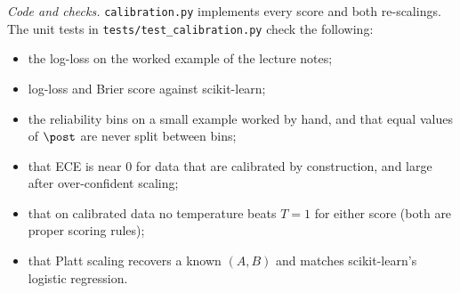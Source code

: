 \begin{sloppypar}
\emph{Code and checks.} \texttt{calibration.py} implements every score and both re-scalings.
The unit tests in \texttt{tests/test\_calibration.py} check the following:
\end{sloppypar}
\begin{itemize}[itemsep=1pt,topsep=2pt]
  \item the log-loss on the worked example of the lecture notes;
  \item log-loss and Brier score against scikit-learn;
  \item the reliability bins on a small example worked by hand, and that equal values of $\post$ are never
        split between bins;
  \item that ECE is near $0$ for data that are calibrated by construction, and large after over-confident
        scaling;
  \item that on calibrated data no temperature beats $T=1$ for either score (both are proper scoring
        rules);
  \item that Platt scaling recovers a known $(A,B)$ and matches scikit-learn's logistic regression.
\end{itemize}
